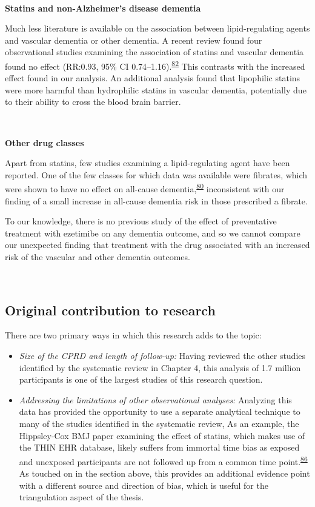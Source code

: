 \documentclass[a4paper, twoside]{templates/ociamthesis}
\providecommand{\tightlist}{%
  \setlength{\itemsep}{0pt}\setlength{\parskip}{0pt}}
\begin{document}
~

\textbf{Statins and non-Alzheimer's disease dementia}

Much less literature is available on the association between lipid-regulating agents and vascular dementia or other dementia. A recent review found four observational studies examining the association of statins and vascular dementia found no effect (RR:0.93, 95\% CI 0.74--1.16).\textsuperscript{\protect\hyperlink{ref-poly2020}{82}} This contrasts with the increased effect found in our analysis. An additional analysis found that lipophilic statins were more harmful than hydrophilic statins in vascular dementia, potentially due to their ability to cross the blood brain barrier.

~

\textbf{Other drug classes}

Apart from statins, few studies examining a lipid-regulating agent have been reported. One of the few classes for which data was available were fibrates, which were shown to have no effect on all-cause dementia,\textsuperscript{\protect\hyperlink{ref-ancelin2012}{80}} inconsistent with our finding of a small increase in all-cause dementia risk in those prescribed a fibrate.

To our knowledge, there is no previous study of the effect of preventative treatment with ezetimibe on any dementia outcome, and so we cannot compare our unexpected finding that treatment with the drug associated with an increased risk of the vascular and other dementia outcomes.

~

\hypertarget{original-contribution-to-research-1}{%
\subsection{Original contribution to research}\label{original-contribution-to-research-1}}

There are two primary ways in which this research adds to the topic:

\begin{itemize}
\tightlist
\item
  \emph{Size of the CPRD and length of follow-up:} Having reviewed the other studies identified by the systematic review in Chapter 4, this analysis of 1.7 million participants is one of the largest studies of this research question.
\item
  \emph{Addressing the limitations of other observational analyses:} Analyzing this data has provided the opportunity to use a separate analytical technique to many of the studies identified in the systematic review, As an example, the Hippsley-Cox BMJ paper examining the effect of statins, which makes use of the THIN EHR database, likely suffers from immortal time bias as exposed and unexposed participants are not followed up from a common time point.\textsuperscript{\protect\hyperlink{ref-hippisley-cox2010}{86}} As touched on in the section above, this provides an additional evidence point with a different source and direction of bias, which is useful for the triangulation aspect of the thesis.
\end{itemize}
\end{document}
